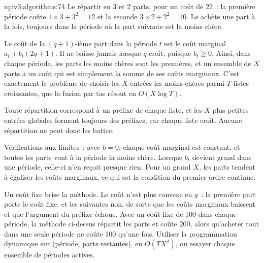 \begin{solution}{iq:iv3:algorithms:74}
Le répartir en 3 et 2 parts, pour un coût de 22~: la première période coûte $1 \times 3 + 3^2 = 12$ et la seconde $3 \times 2 + 2^2 = 10$. Le  achète une part à la fois, toujours dans la période où la part suivante est la moins chère.
\label{lst:iv3:al:slicing}

Le coût de la $(q + 1)$-ième part dans la période $t$ est le coût marginal $a_t + b_t(2q + 1)$. Il ne baisse jamais lorsque $q$ croît, puisque $b_t \ge 0$. Ainsi, dans chaque période, les parts les moins chères sont les premières, et un ensemble de $X$ parts a un coût qui est simplement la somme de ses coûts marginaux. C'est exactement le problème de choisir les $X$ entrées les moins chères parmi $T$ listes croissantes, que la fusion par tas résout en $O(X \log T)$.

Toute répartition correspond à un préfixe de chaque liste, et les $X$ plus petites entrées globales forment toujours des préfixes, car chaque liste croît. Aucune répartition ne peut donc les battre.

Vérifications aux limites~: avec $b = 0$, chaque coût marginal est constant, et toutes les parts vont à la période la moins chère. Lorsque $b_t$ devient grand dans une période, celle-ci n'en reçoit presque rien. Pour un grand $X$, les parts tendent à égaliser les coûts marginaux, ce qui est la condition du premier ordre continue.

Un coût fixe brise la méthode. Le coût n'est plus convexe en $q$~: la première part porte le coût fixe, et les suivantes non, de sorte que les coûts marginaux baissent et que l'argument du préfixe échoue. Avec un coût fixe de 100 dans chaque période, la méthode ci-dessus répartit les parts et coûte 200, alors qu'acheter tout dans une seule période ne coûte 100 qu'une fois. Utiliser la programmation dynamique sur (période, parts restantes), en $O(TX^2)$, ou essayer chaque ensemble de périodes actives.

\end{solution}

